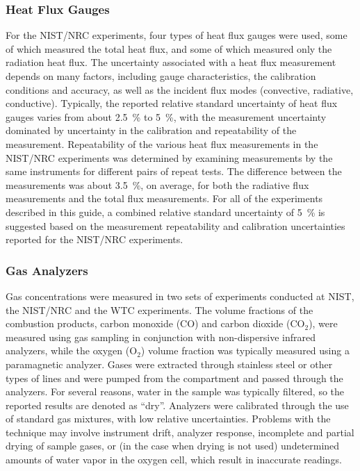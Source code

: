 \subsubsection{Heat Flux Gauges}

For the NIST/NRC experiments, four types of heat flux gauges were used, some of which measured the total heat flux, and some of which measured only the radiation heat flux. The uncertainty associated with a heat flux measurement depends on many factors, including gauge characteristics, the calibration conditions and accuracy, as well as the incident flux modes (convective, radiative, conductive). Typically, the reported relative standard uncertainty of heat flux gauges varies from about 2.5~\% to 5~\%, with the measurement uncertainty dominated by uncertainty in the calibration and repeatability of the measurement. Repeatability of the various heat flux measurements in the NIST/NRC experiments was determined by examining measurements by the same instruments for different pairs of repeat tests. The difference between the measurements was about 3.5~\%, on average, for both the radiative flux measurements and the total flux measurements. For all of the experiments described in this guide, a combined relative standard uncertainty of 5~\% is suggested based on the measurement repeatability and calibration uncertainties reported for the NIST/NRC experiments.

\subsubsection{Gas Analyzers}

Gas concentrations were measured in two sets of experiments conducted at NIST, the NIST/NRC and the WTC experiments. The volume fractions of the combustion products, carbon monoxide (CO) and carbon dioxide (CO$_2$), were measured using gas sampling in conjunction with non-dispersive infrared analyzers, while the oxygen (O$_2$) volume fraction was typically measured using a paramagnetic analyzer. Gases were extracted through stainless steel or other types of lines and were pumped from the compartment and passed through the analyzers. For several reasons, water in the sample was typically filtered, so the reported results are denoted as ``dry''. Analyzers were calibrated through the use of standard gas mixtures, with low relative uncertainties. Problems with the technique may involve instrument drift, analyzer response, incomplete and partial drying of sample gases, or (in the case when drying is not used) undetermined amounts of water vapor in the oxygen cell, which result in inaccurate readings.

